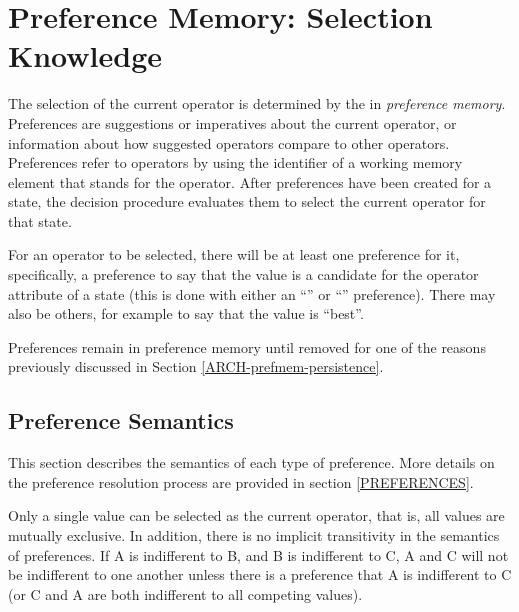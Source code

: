 \section{Preference Memory: Selection Knowledge} 
\label{ARCH-prefmem}


The selection of the current operator is determined by the  in
\emph{preference memory}. Preferences are suggestions or imperatives about the
current operator, or information about how suggested operators compare
to other operators.  Preferences refer to operators by using the
identifier of a working memory element that stands for the operator.
After preferences have been created for a state, the decision procedure
evaluates them to select the current operator for that state.

For an operator to be selected, there will be at least one preference
for it, specifically, a preference to say that the value is a candidate
for the operator attribute of a state (this is done with either an
``'' or ``'' preference). There may also
be others, for example to say that the value is ``best''.

Preferences remain in preference memory until removed for one of the reasons previously discussed in
Section \ref{ARCH-prefmem-persistence}.

\subsection{Preference Semantics}
\label{ARCH-prefmem-semantics}

This section describes the semantics of each type of preference.  More
details on the preference resolution process are provided in
section \ref{PREFERENCES}.


Only a single value can be selected as the current operator, that is,
all values are mutually exclusive.  In addition, there is no implicit
transitivity in the semantics of preferences.  If A is indifferent to B,
and B is indifferent to C, A and C will not be indifferent to one
another unless there is a preference that A is indifferent to C (or C
and A are both indifferent to all competing values).

